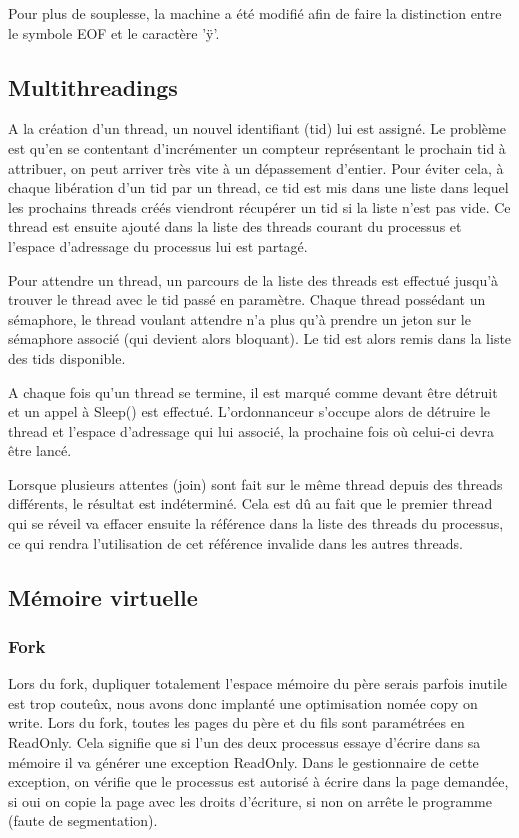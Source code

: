 \documentclass{article}
\begin{document}
Pour plus de souplesse, la machine a été modifié afin de faire la distinction entre le symbole EOF et le caractère 'ÿ'.

\subsection{Multithreadings}
A la création d'un thread, un nouvel identifiant (tid) lui est assigné. Le problème est qu'en se contentant d'incrémenter un compteur représentant le prochain tid à attribuer, on peut arriver très vite à un dépassement d'entier. Pour éviter cela, à chaque libération d'un tid par un thread, ce tid est mis dans une liste dans lequel les prochains threads créés viendront récupérer un tid si la liste n'est pas vide.
Ce thread est ensuite ajouté dans la liste des threads courant du processus et l'espace d'adressage du processus lui est partagé.

Pour attendre un thread, un parcours de la liste des threads est effectué jusqu'à trouver le thread avec le tid passé en paramètre. Chaque thread possédant un sémaphore, le thread voulant attendre n'a plus qu'à prendre un jeton sur le sémaphore associé (qui devient alors bloquant). Le tid est alors remis dans la liste des tids disponible.

A chaque fois qu'un thread se termine, il est marqué comme devant être détruit et un appel à Sleep() est effectué.
L'ordonnanceur s'occupe alors de détruire le thread et l'espace d'adressage qui lui associé, la prochaine fois où celui-ci devra être lancé.

Lorsque plusieurs attentes (join) sont fait sur le même thread depuis des threads différents, le résultat est indéterminé. Cela est dû au fait que le premier thread qui se réveil va effacer ensuite la référence dans la liste des threads du processus, ce qui rendra l'utilisation de cet référence invalide dans les autres threads.

\subsection{Mémoire virtuelle}
\subsubsection{Fork}
Lors du fork, dupliquer totalement l'espace mémoire du père serais parfois inutile est trop couteûx, nous avons donc implanté une optimisation nomée copy on write.  Lors du fork, toutes les pages du père et du fils sont paramétrées en ReadOnly.  Cela signifie que si l'un des deux processus essaye d'écrire dans sa mémoire il va générer une exception ReadOnly.  Dans le gestionnaire de cette exception, on vérifie que le processus est autorisé à écrire dans la page demandée, si oui on copie la page avec les droits d'écriture, si non on arrête le programme (faute de segmentation).\\
\end{document}
